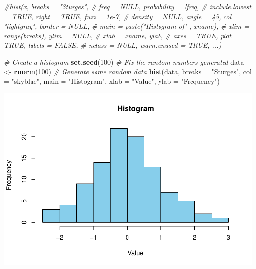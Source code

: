 \documentclass[
]{book}
\newenvironment{Shaded}{\begin{snugshade}}{\end{snugshade}}
\newcommand{\AttributeTok}[1]{\textcolor[rgb]{0.13,0.29,0.53}{#1}}
\newcommand{\CommentTok}[1]{\textcolor[rgb]{0.56,0.35,0.01}{\textit{#1}}}
\newcommand{\DecValTok}[1]{\textcolor[rgb]{0.00,0.00,0.81}{#1}}
\newcommand{\FunctionTok}[1]{\textcolor[rgb]{0.13,0.29,0.53}{\textbf{#1}}}
\newcommand{\NormalTok}[1]{#1}
\newcommand{\OtherTok}[1]{\textcolor[rgb]{0.56,0.35,0.01}{#1}}
\newcommand{\StringTok}[1]{\textcolor[rgb]{0.31,0.60,0.02}{#1}}
\begin{document}
\begin{Shaded}
\begin{Highlighting}[]
\CommentTok{\#hist(x, breaks = "Sturges",}
\CommentTok{\#     freq = NULL, probability = !freq,}
\CommentTok{\#     include.lowest = TRUE, right = TRUE, fuzz = 1e{-}7,}
\CommentTok{\#     density = NULL, angle = 45, col = "lightgray", border = NULL,}
\CommentTok{\#     main = paste("Histogram of" , xname),}
\CommentTok{\#     xlim = range(breaks), ylim = NULL,}
\CommentTok{\#     xlab = xname, ylab,}
\CommentTok{\#     axes = TRUE, plot = TRUE, labels = FALSE,}
\CommentTok{\#     nclass = NULL, warn.unused = TRUE, ...)}
\end{Highlighting}
\end{Shaded}

\begin{Shaded}
\begin{Highlighting}[]
\CommentTok{\# Create a histogram}
\FunctionTok{set.seed}\NormalTok{(}\DecValTok{100}\NormalTok{)  }\CommentTok{\# Fix the random numbers generated}
\NormalTok{data }\OtherTok{\textless{}{-}} \FunctionTok{rnorm}\NormalTok{(}\DecValTok{100}\NormalTok{)  }\CommentTok{\# Generate some random data}
\FunctionTok{hist}\NormalTok{(data, }\AttributeTok{breaks =} \StringTok{"Sturges"}\NormalTok{, }\AttributeTok{col =} \StringTok{"skyblue"}\NormalTok{, }\AttributeTok{main =} \StringTok{"Histogram"}\NormalTok{, }\AttributeTok{xlab =} \StringTok{"Value"}\NormalTok{, }\AttributeTok{ylab =} \StringTok{"Frequency"}\NormalTok{)}
\end{Highlighting}
\end{Shaded}

\includegraphics{_main_files/figure-latex/unnamed-chunk-27-1.pdf}
\end{document}

